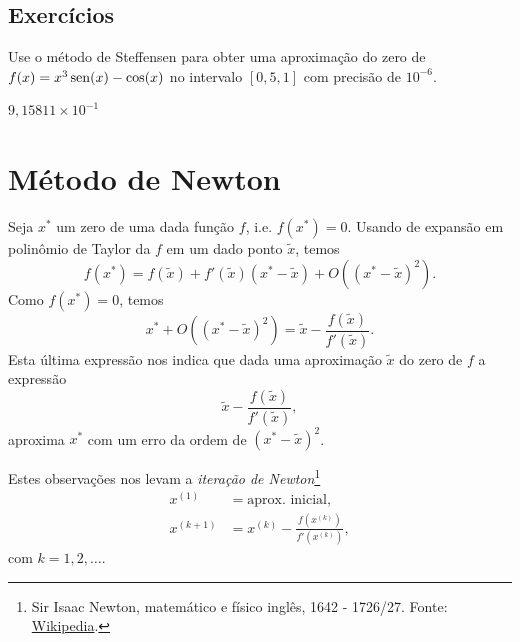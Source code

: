 \subsection*{Exercícios}

\begin{exer}
  Use o método de Steffensen para obter uma aproximação do zero de $f(x)=x^3\operatorname{sen}(x)-\cos(x)$ no intervalo $[0,5, 1]$ com precisão de $10^{-6}$.
\end{exer}
\begin{resp}
    $9,15811\times 10^{-1}$
\end{resp}

\section{Método de Newton}\label{cap_mef1d_sec_newton}

Seja $x^*$ um zero de uma dada função $f$, i.e. $f(x^*)=0$. Usando de expansão em polinômio de Taylor da $f$ em um dado ponto $\tilde{x}$, temos
\begin{equation}
  f(x^*) = f(\tilde{x}) + f'(\tilde{x})(x^*-\tilde{x}) + O((x^*-\tilde{x})^2).
\end{equation}
Como $f(x^*)=0$, temos
\begin{equation}
  x^* + O((x^*-\tilde{x})^2) = \tilde{x} - \frac{f(\tilde{x})}{f'(\tilde{x})}.
\end{equation}
Esta última expressão nos indica que dada uma aproximação $\tilde{x}$ do zero de $f$ a expressão
\begin{equation}
  \tilde{x} - \frac{f(\tilde{x})}{f'(\tilde{x})},
\end{equation}
aproxima $x^*$ com um erro da ordem de $(x^*-\tilde{x})^2$.

Estes observações nos levam a \emph{iteração de Newton}\footnote{Sir Isaac Newton, matemático e físico inglês, 1642 - 1726/27. Fonte: \href{https://en.wikipedia.org/wiki/Isaac_Newton}{Wikipedia}.}
\begin{align}
  x^{(1)} &= \text{aprox. inicial},\\
  x^{(k+1)} &= x^{(k)} - \frac{f(x^{(k)})}{f'(x^{(k)})},\label{eq:Newton_iteracao}
\end{align}
com $k=1, 2, \ldots$.

